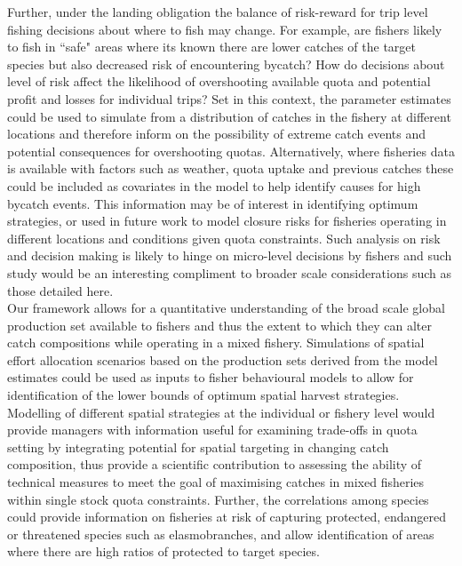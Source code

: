\documentclass[fleqn,10pt]{wlscirep}
\begin{document}
\begin{linenumbers}
Further, under the landing obligation the balance of risk-reward for trip level
fishing decisions about where to fish may change. For example, are fishers
likely to fish in ``safe" areas where its known there are lower catches of the
target species but also decreased risk of encountering bycatch? How do
decisions about level of risk affect the likelihood of overshooting available
quota and potential profit and losses for individual trips? Set in this
context, the parameter estimates could be used to simulate from a distribution
of catches in the fishery at different locations and therefore inform on the
possibility of extreme catch events and potential consequences for overshooting
quotas. Alternatively, where fisheries data is available with factors such as
weather, quota uptake and previous catches these could be included as
covariates in the model to help identify causes for high bycatch events. This
information may be of interest in identifying optimum strategies, or used in
future work to model closure risks for fisheries operating in different
locations and conditions given quota constraints. Such analysis on risk and
decision making is likely to hinge on micro-level decisions by fishers and such
study would be an interesting compliment to broader scale considerations such
as those detailed here. \\

Our framework allows for a quantitative understanding of the broad scale global
production set available to fishers\cite{Reimer2017} and thus the extent to
which they can alter catch compositions while operating in a mixed fishery.
Simulations of spatial effort allocation scenarios based on the production sets
derived from the model estimates could be used as inputs to fisher behavioural
models to allow for identification of the lower bounds of optimum spatial
harvest strategies. Modelling of different spatial strategies at the individual
or fishery level would provide managers with information useful for examining
trade-offs in quota setting by integrating potential for spatial targeting in
changing catch composition, thus provide a scientific contribution to assessing
the ability of technical measures to meet the goal of maximising catches in
mixed fisheries within single stock quota constraints\cite{Ulrich2016}.
Further, the correlations among species could provide information on fisheries
at risk of capturing protected, endangered or threatened species such as
elasmobranches, and allow identification of areas where there are high ratios
of protected to target species.\\


\end{linenumbers}
\end{document}

